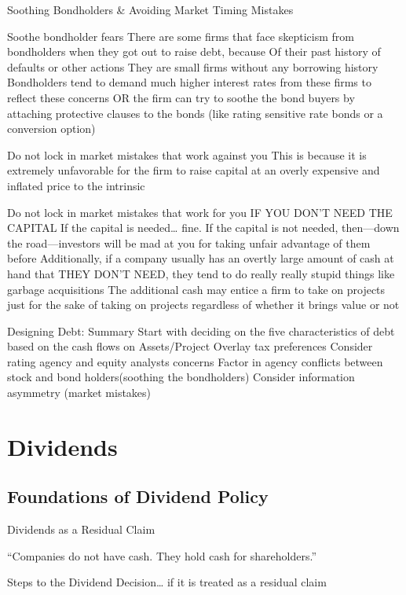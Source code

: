 \documentclass[10pt]{article}
\begin{document}
    \begin{core}{Soothing Bondholders \& Avoiding Market Timing Mistakes}

      Soothe bondholder fears
      There are some firms that face skepticism from bondholders when they got out to raise debt, because
      Of their past history of defaults or other actions
      They are small firms without any borrowing history
      Bondholders tend to demand much higher interest rates from these firms to reflect these concerns OR the firm can try to soothe the bond buyers by attaching protective clauses to the bonds (like rating sensitive rate bonds or a conversion option)

      Do not lock in market mistakes that work against you
      This is because it is extremely unfavorable for the firm to raise capital at an overly expensive and inflated price to the intrinsic

      Do not lock in market mistakes that work for you IF YOU DON’T NEED THE CAPITAL
      If the capital is needed… fine.
      If the capital is not needed, then—down the road—investors will be mad at you for taking unfair advantage of them before
      Additionally, if a company usually has an overtly large amount of cash at hand that THEY DON’T NEED, they tend to do really really stupid things like garbage acquisitions
      The additional cash may entice a firm to take on projects just for the sake of taking on projects regardless of whether it brings value or not

      Designing Debt: Summary
      Start with deciding on the five characteristics of debt based on the cash flows on Assets/Project
      Overlay tax preferences
      Consider rating agency and equity analysts concerns
      Factor in agency conflicts between stock and bond holders(soothing the bondholders)
      Consider information asymmetry (market mistakes)

    \end{core}

\section{Dividends}

  \subsection{Foundations of Dividend Policy}

    \begin{core}{Dividends as a Residual Claim}

      “Companies do not have cash. They hold cash for shareholders.”

      Steps to the Dividend Decision… if it is treated as a residual claim


    \end{core}
\end{document}
